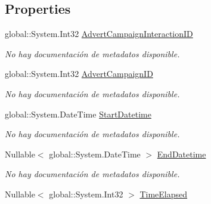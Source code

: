 \subsection*{Properties}
\begin{DoxyCompactItemize}
\item 
global\-::\-System.\-Int32 \hyperlink{class_microsoft_1_1_samples_1_1_kinect_1_1_basic_interactions_1_1_advert_campaign_interactions_acafaecce824e46688b6d2c1e7f18713e}{Advert\-Campaign\-Interaction\-I\-D}
\begin{DoxyCompactList}\small\item\em No hay documentación de metadatos disponible. \end{DoxyCompactList}\item 
global\-::\-System.\-Int32 \hyperlink{class_microsoft_1_1_samples_1_1_kinect_1_1_basic_interactions_1_1_advert_campaign_interactions_aef590b2b054b938d2ef15f99f3a7adaf}{Advert\-Campaign\-I\-D}
\begin{DoxyCompactList}\small\item\em No hay documentación de metadatos disponible. \end{DoxyCompactList}\item 
global\-::\-System.\-Date\-Time \hyperlink{class_microsoft_1_1_samples_1_1_kinect_1_1_basic_interactions_1_1_advert_campaign_interactions_aa32fcb1d41749aa3624c589cf45e639f}{Start\-Datetime}
\begin{DoxyCompactList}\small\item\em No hay documentación de metadatos disponible. \end{DoxyCompactList}\item 
Nullable$<$ global\-::\-System.\-Date\-Time $>$ \hyperlink{class_microsoft_1_1_samples_1_1_kinect_1_1_basic_interactions_1_1_advert_campaign_interactions_ae608748cf1c416bbd7648d7bad6e6987}{End\-Datetime}
\begin{DoxyCompactList}\small\item\em No hay documentación de metadatos disponible. \end{DoxyCompactList}\item 
Nullable$<$ global\-::\-System.\-Int32 $>$ \hyperlink{class_microsoft_1_1_samples_1_1_kinect_1_1_basic_interactions_1_1_advert_campaign_interactions_ac4f4469d85fc6292cd781529767ad7ab}{Time\-Elapsed}

\end{DoxyCompactItemize}
